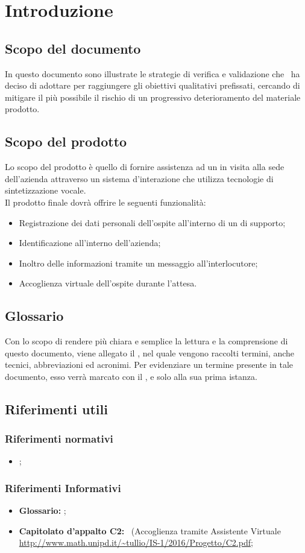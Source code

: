 \documentclass[../PianoDiQualifica_v4.0.0.tex]{subfiles}
\begin{document}
\section{Introduzione}

	\subsection{Scopo del documento}
	In questo documento sono illustrate le strategie di verifica e validazione che \kpanic\ ha deciso di adottare per raggiungere gli obiettivi qualitativi prefissati, cercando di mitigare il più possibile il rischio di un progressivo deterioramento del materiale prodotto.
	
	\subsection{Scopo del prodotto}
	Lo scopo del prodotto è quello di fornire assistenza ad un  in visita alla sede dell'azienda attraverso un sistema d'interazione che utilizza tecnologie di sintetizzazione vocale.
	\\Il prodotto finale dovrà offrire le seguenti funzionalità:
	\begin{itemize}
		\item Registrazione dei dati personali dell'ospite all'interno di un  di supporto;
		\item Identificazione  all'interno dell'azienda;
		\item Inoltro delle informazioni tramite un messaggio  all'interlocutore;
		\item Accoglienza virtuale dell'ospite durante l'attesa.
	\end{itemize}

	\subsection{Glossario}
	Con lo scopo di rendere più chiara e semplice la lettura e la comprensione di questo documento, viene allegato il \glossariov, nel quale vengono raccolti termini, anche tecnici, abbreviazioni ed acronimi. Per evidenziare un termine presente in tale documento, esso verrà marcato con il , e solo alla sua prima istanza.
	
	\subsection{Riferimenti utili}
		\subsubsection{Riferimenti normativi}
		\begin{itemize}
			\item \textbf{\normediprogettov};
		\end{itemize}
	
		\subsubsection{Riferimenti Informativi}	
		\begin{itemize}
			\item \textbf{Glossario:} \glossariov;
			\item\textbf{Capitolato d'appalto C2:} \progetto\ (Accoglienza tramite Assistente Virtuale \url{http://www.math.unipd.it/~tullio/IS-1/2016/Progetto/C2.pdf};
		\end{itemize}
			
\end{document}
